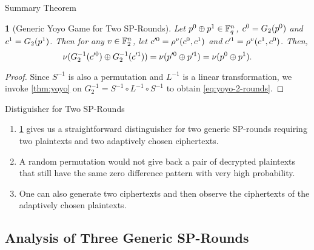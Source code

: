 \documentclass[notheorems]{beamer}
\newtheorem{theorem}{\translate{Theorem}}[section]
\newtheorem{theorem}{\translate{Theorem}}
\theoremstyle{definition}
\theoremstyle{example}
\begin{document}
    \begin{frame}{Summary Theorem}
        \begin{theorem}[Generic Yoyo Game for Two SP-Rounds]
            \label{thm:yoyo-2-rounds}
            Let \(p^0 \oplus p^1 \in \mathbb F_q^n\), \(c^0 = G_2(p^0)\) and
            \(c^1 = G_2(p^1)\). Then for any \(v \in \mathbb F_2^n\), let
            \(c^{\prime 0} = \rho^v(c^0, c^1)\) and \(c^{\prime 1} =
            \rho^v(c^1, c^0)\). Then,
            \begin{equation}
                \nu(G_2^{-1}(c^{\prime 0}) \oplus G_2^{-1}(c^{\prime 1})) = \nu(p^{\prime 0} \oplus p^{\prime 1}) = \nu(p^0 \oplus p^1).
                \label{eq:yoyo-2-rounds}
            \end{equation}
        \end{theorem}
        \pause
        \begin{proof}
            Since \(S^{-1}\) is also a permutation and \(L^{-1}\) is a linear
            transformation, we invoke \cref{thm:yoyo} on \(G_2^{-1} = S^{-1}
            \circ L^{-1} \circ S^{-1}\) to obtain \eqref{eq:yoyo-2-rounds}.
        \end{proof}
    \end{frame}

    \begin{frame}[<+->]{Distiguisher for Two SP-Rounds}
        \begin{enumerate}
            \item \cref{thm:yoyo-2-rounds} gives us a straightforward
            distinguisher for two generic SP-rounds requiring two plaintexts and
            two adaptively chosen ciphertexts. 
            \item A random permutation would not give back a pair of decrypted
            plaintexts that still have the same zero difference pattern with
            very high probability. 
            \item One can also generate two ciphertexts and then observe the
            ciphertexts of the adaptively chosen plaintexts.
        \end{enumerate}
    \end{frame}

    \subsection{Analysis of Three Generic SP-Rounds}
    \label{subsec:yoyo-3-rounds}
\end{document}
